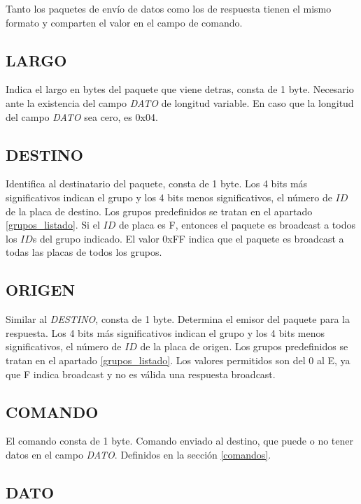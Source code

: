 \documentclass[a4paper,10pt]{article}
\begin{document}
Tanto los paquetes de env\'io de datos como los de respuesta tienen el mismo formato y comparten el valor en el campo de comando.

\subsection{LARGO}
\label{largo}

	Indica el largo en bytes del paquete que viene detras, consta de 1 byte.
	Necesario ante la existencia del campo \emph{DATO} de longitud variable.
	En caso que la longitud del campo \emph{DATO} sea cero, es 0x04.

\subsection{DESTINO}
\label{tipo_destinatario}

	Identifica al destinatario del paquete, consta de 1 byte.
	Los 4 bits m\'as significativos indican el grupo y los 4 bits menos significativos, el n\'umero de $ID$ de la placa de destino.
	Los grupos predefinidos se tratan en el apartado \ref{grupos_listado}.
	Si el $ID$ de placa es F, entonces el paquete es broadcast a todos los $ID$s del grupo indicado.
	El valor 0xFF indica que el paquete es broadcast a todas las placas de todos los grupos.

\subsection{ORIGEN}
\label{tipo_emisor}

	Similar al \emph{DESTINO}, consta de 1 byte.
	Determina el emisor del paquete para la respuesta.
	Los 4 bits m\'as significativos indican el grupo y los 4 bits menos significativos, el n\'umero de $ID$ de la placa de origen.
	Los grupos predefinidos se tratan en el apartado \ref{grupos_listado}.
	Los valores permitidos son del 0 al E, ya que F indica broadcast y no es v\'alida una respuesta broadcast.

\subsection{COMANDO}
\label{comando}

	El comando consta de 1 byte.
	Comando enviado al destino, que puede o no tener datos en el campo \emph{DATO}.
	Definidos en la secci\'on \ref{comandos}.


\subsection{DATO}
\label{dato}
\end{document}
